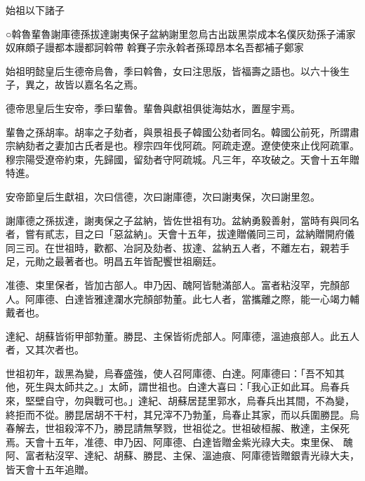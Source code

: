 
\begin{pinyinscope}

 始祖以下諸子



 ○斡魯輩魯謝庫德孫拔達謝夷保子盆納謝里忽烏古出跋黑崇成本名僕灰劾孫子浦家奴麻頗子謾都本謾都訶斡帶
 斡賽子宗永斡者孫璋昂本名吾都補子鄭家



 始祖明懿皇后生德帝烏魯，季曰斡魯，女曰注思版，皆福壽之語也。以六十後生子，異之，故皆以嘉名名之焉。



 德帝思皇后生安帝，季曰輩魯。輩魯與獻祖俱徙海姑水，置屋宇焉。



 輩魯之孫胡率。胡率之子劾者，與景祖長子韓國公劾者同名。韓國公前死，所謂肅宗納劾者之妻加古氏者是也。穆宗四年伐阿疏。阿疏走遼。遼使使來止伐阿疏軍。穆宗陽受遼帝約束，先歸國，留劾者守阿疏城。凡三年，卒攻破之。天會十五年贈特進。



 安帝節皇后生獻祖，次曰信德，次曰謝庫德，次曰謝夷保，次曰謝里忽。



 謝庫德之孫拔達，謝夷保之子盆納，皆佐世祖有功。盆納勇毅善射，當時有與同名者，嘗有貳志，目之曰「惡盆納」。天會十五年，拔達贈儀同三司，盆納贈開府儀同三司。在世祖時，歡都、冶訶及劾者、拔達、盆納五人者，不離左右，親若手足，元勛之最著者也。明昌五年皆配饗世祖廟廷。



 准德、束里保者，皆加古部人。申乃因、醜阿皆馳滿部人。富者粘沒罕，完顏部人。阿庫德、白達皆雅達瀾水完顏部勃董。此七人者，當攜離之際，能一心竭力輔
 戴者也。



 達紀、胡蘇皆術甲部勃董。勝昆、主保皆術虎部人。阿庫德，溫迪痕部人。此五人者，又其次者也。



 世祖初年，跋黑為變，烏春盛強，使人召阿庫德、白達。阿庫德曰：「吾不知其他，死生與太師共之。」太師，謂世祖也。白達大喜曰：「我心正如此耳。烏春兵來，堅壁自守，勿與戰可也。」達紀、胡蘇居琵里郭水，烏春兵出其間，不為變，終拒而不從。勝昆居胡不干村，其兄滓不乃勃堇，烏春止其家，而以兵圍勝昆。烏春解去，世祖殺滓不乃，勝昆請無孥戮，世祖從之。世祖破桓赧、散達，主保死焉。天會十五年，准德、申乃因、阿庫德、白達皆贈金紫光祿大夫。束里保、
 醜阿、富者粘沒罕、達紀、胡蘇、勝昆、主保、溫迪痕、阿庫德皆贈銀青光祿大夫，皆天會十五年追贈。




\end{pinyinscope}
